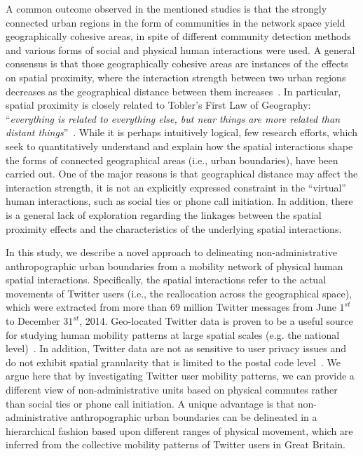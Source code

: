 \documentclass[]{tGIS2e}
\begin{document}
A common outcome observed in the mentioned studies is that the strongly connected urban regions in the form of communities in the network space yield geographically cohesive areas, in spite of different community detection methods and various forms of social and physical human interactions were used.
A general consensus is that those geographically cohesive areas are instances of the effects on spatial proximity, where the interaction strength between two urban regions decreases as the geographical distance between them increases~\citep{fotheringham1981}.
In particular, spatial proximity is closely related to Tobler's First Law of Geography: ``\textit{everything is related to everything else, but near things are more related than distant things}''~\citep{miller2004}.
While it is perhaps intuitively logical, few research efforts, which seek to quantitatively understand and explain how the spatial interactions shape the forms of connected geographical areas (i.e., urban boundaries), have been carried out. 
One of the major reasons is that geographical distance may affect the interaction strength, it is not an explicitly expressed constraint in the ``virtual'' human interactions, such as social ties or phone call initiation.
In addition, there is a general lack of exploration regarding the linkages between the spatial proximity effects and the characteristics of the underlying spatial interactions. 

In this study, we describe a novel approach to delineating non-administrative anthropographic urban boundaries from a mobility network of physical human spatial interactions.
Specifically, the spatial interactions refer to the actual movements of Twitter users (i.e., the reallocation across the geographical space), which were extracted from more than 69 million Twitter messages from June $1^{st}$ to December $31^{st}$, 2014.
Geo-located Twitter data is proven to be a useful source for studying human mobility patterns at large spatial scales (e.g. the national level)~\citep{hawelka,jurdak2015}.
In addition, Twitter data are not as sensitive to user privacy issues and do not exhibit spatial granularity that is limited to the postal code level~\citep{thiemann}. 
We argue here that by investigating Twitter user mobility patterns, we can provide a different view of non-administrative units based on physical commutes rather than social ties or phone call initiation. 
A unique advantage is that non-administrative anthropographic urban boundaries can be delineated in a hierarchical fashion based upon different ranges of physical movement, which are inferred from the collective mobility patterns of Twitter users in Great Britain. 
\end{document}
